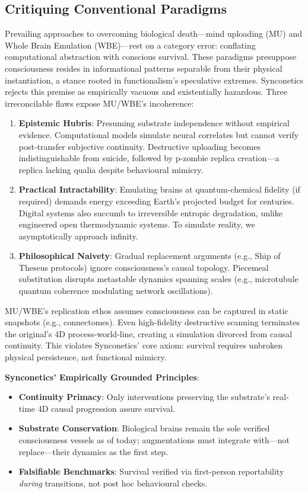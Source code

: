 \documentclass[10pt]{article}
\begin{document}
\begin{sloppypar}
  \subsection{Critiquing Conventional Paradigms}
  \label{sec:new-paradigm}

  Prevailing approaches to overcoming biological death—mind uploading (MU) and Whole Brain Emulation (WBE)—rest on a category error: conflating computational abstraction with conscious survival. These paradigms presuppose consciousness resides in informational patterns separable from their physical instantiation, a stance rooted in functionalism’s speculative extremes. Synconetics rejects this premise as empirically vacuous and existentially hazardous. Three irreconcilable flaws expose MU/WBE’s incoherence:

  \begin{enumerate}
    \item \textbf{Epistemic Hubris}: Presuming substrate independence without empirical evidence. Computational models simulate neural correlates but cannot verify post-transfer subjective continuity. Destructive uploading becomes indistinguishable from suicide, followed by p-zombie replica creation—a replica lacking qualia despite behavioural mimicry.
    \item \textbf{Practical Intractability}: Emulating brains at quantum-chemical fidelity (if required) demands energy exceeding Earth’s projected budget for centuries. Digital systems also succumb to irreversible entropic degradation, unlike engineered open thermodynamic systems. To simulate reality, we asymptotically approach infinity.
    \item \textbf{Philosophical Naivety}: Gradual replacement arguments (e.g., Ship of Theseus protocols) ignore consciousness’s causal topology. Piecemeal substitution disrupts metastable dynamics spanning scales (e.g., microtubule quantum coherence modulating network oscillations).
  \end{enumerate}

  MU/WBE’s replication ethos assumes consciousness can be captured in static snapshots (e.g., connectomes). Even high-fidelity destructive scanning terminates the original’s 4D process-world-line, creating a simulation divorced from causal continuity. This violates Synconetics’ core axiom: survival requires unbroken physical persistence, not functional mimicry.

  \textbf{Synconetics’ Empirically Grounded Principles}:
  \begin{itemize}
    \item \textbf{Continuity Primacy}: Only interventions preserving the substrate’s real-time 4D causal progression assure survival.
    \item \textbf{Substrate Conservation}: Biological brains remain the sole verified consciousness vessels as of today; augmentations must integrate with—not replace—their dynamics as the first step.
    \item \textbf{Falsifiable Benchmarks}: Survival verified via first-person reportability \textit{during} transitions, not post hoc behavioural checks.
  \end{itemize}


\end{sloppypar}
\end{document}
